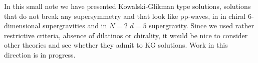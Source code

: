 \documentclass[a4paper,12pt]{article}
\begin{document}
%
%
\par
In this small note we have presented Kowalski-Glikman type solutions, solutions
that do not break any supersymmetry and that look like pp-waves, in 
in chiral 6-dimensional supergravities and in $N=2$ $d=5$ supergravity.
Since we used rather restrictive criteria, absence of dilatinos or
chirality, it would be nice to consider other theories and see whether
they admit to KG solutions. Work in this direction is in progress.
%
%
\end{document}

